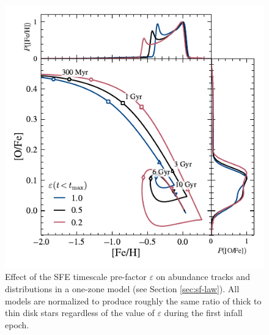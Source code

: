 \documentclass[twocolumn,twocolappendix,linenumbers]{aastex631}
\begin{document}
\begin{figure}
    \centering
    \includegraphics{src/tex/figures/sfe_prefactor.pdf}
    \caption{Effect of the SFE timescale pre-factor $\varepsilon$ on abundance tracks and distributions in a one-zone model (see Section \ref{sec:sf-law}). All models are normalized to produce roughly the same ratio of thick to thin disk stars regardless of the value of $\varepsilon$ during the first infall epoch.}
    \label{fig:sfe-prefactor}
\end{figure}
\end{document}
